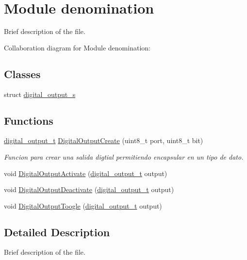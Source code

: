 \hypertarget{group__name}{}\section{Module denomination}
\label{group__name}


Brief description of the file.  


Collaboration diagram for Module denomination\+:
\subsection*{Classes}
\begin{DoxyCompactItemize}
\item 
struct \hyperlink{structdigital__output__s}{digital\+\_\+output\+\_\+s}
\end{DoxyCompactItemize}
\subsection*{Functions}
\begin{DoxyCompactItemize}
\item 
\hyperlink{group___plantilla_ga3e63b19d3d0dbfbfb2c50b3ac1f69aa0}{digital\+\_\+output\+\_\+t} \hyperlink{group__name_ga99386f34f6a3040267ecb98215761571}{Digital\+Output\+Create} (uint8\+\_\+t port, uint8\+\_\+t bit)
\begin{DoxyCompactList}\small\item\em Funcion para crear una salida digtial permitiendo encapsular en un tipo de dato. \end{DoxyCompactList}\item 
void \hyperlink{group__name_ga1f511c067eceef7bc5ccddfda3255b9b}{Digital\+Output\+Activate} (\hyperlink{group___plantilla_ga3e63b19d3d0dbfbfb2c50b3ac1f69aa0}{digital\+\_\+output\+\_\+t} output)
\item 
void \hyperlink{group__name_ga0d953039d5fb5d7166f961689475161e}{Digital\+Output\+Deactivate} (\hyperlink{group___plantilla_ga3e63b19d3d0dbfbfb2c50b3ac1f69aa0}{digital\+\_\+output\+\_\+t} output)
\item 
void \hyperlink{group__name_ga7f1a1e6f816d67f9090602e3257be6a6}{Digital\+Output\+Toogle} (\hyperlink{group___plantilla_ga3e63b19d3d0dbfbfb2c50b3ac1f69aa0}{digital\+\_\+output\+\_\+t} output)
\end{DoxyCompactItemize}


\subsection{Detailed Description}
Brief description of the file. 

